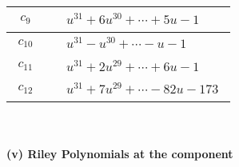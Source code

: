 \documentclass[1p]{elsarticle_modified}
\theoremstyle{definition}
\begin{document}
\begin{tabular}{m{50pt}|m{274pt}}
\hline $$\begin{aligned}c_{9}\end{aligned}$$&$\begin{aligned}
&u^{31}+6 u^{30}+\cdots+5 u-1
\end{aligned}$\\
\hline $$\begin{aligned}c_{10}\end{aligned}$$&$\begin{aligned}
&u^{31}- u^{30}+\cdots- u-1
\end{aligned}$\\
\hline $$\begin{aligned}c_{11}\end{aligned}$$&$\begin{aligned}
&u^{31}+2 u^{29}+\cdots+6 u-1
\end{aligned}$\\
\hline $$\begin{aligned}c_{12}\end{aligned}$$&$\begin{aligned}
&u^{31}+7 u^{29}+\cdots-82 u-173
\end{aligned}$\\
\hline
\end{tabular}\\~\\
\newpage\renewcommand{\arraystretch}{1}
\flushleft \textbf{(v) Riley Polynomials at the component}\newline \\
\end{document}
